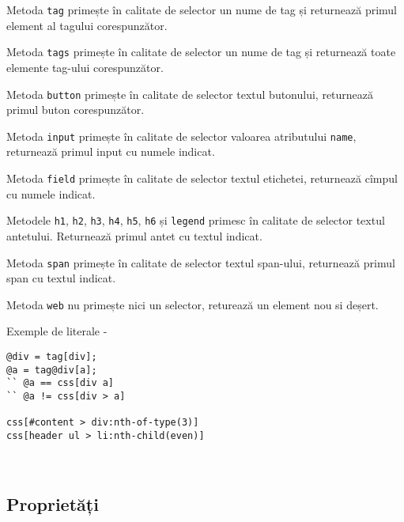 Metoda \texttt{tag} primește în calitate de selector un nume de tag și returnează primul element al tagului corespunzător.

Metoda \texttt{tags} primește în calitate de selector un nume de tag și returnează toate elemente tag-ului corespunzător.

Metoda \texttt{button} primește în calitate de selector textul butonului, returnează primul buton corespunzător.

Metoda \texttt{input} primește în calitate de selector valoarea atributului \texttt{name}, returnează primul input cu numele indicat.

Metoda \texttt{field} primește în calitate de selector textul etichetei, returnează cîmpul cu numele indicat.

Metodele \texttt{h1}, \texttt{h2}, \texttt{h3}, \texttt{h4}, \texttt{h5}, \texttt{h6} și \texttt{legend} primesc în calitate de selector textul antetului. Returnează primul antet cu textul indicat. 

Metoda \texttt{span} primește în calitate de selector textul span-ului, returnează primul span cu textul indicat.

Metoda \texttt{web} nu primește nici un selector, returează un element nou si deșert.

\newpage
Exemple de literale -
\begin{verbatim}
@div = tag[div];
@a = tag@div[a];
`` @a == css[div a]
`` @a != css[div > a]

css[#content > div:nth-of-type(3)]
css[header ul > li:nth-child(even)]
\end{verbatim}

\

\subsection{Proprietăți}

